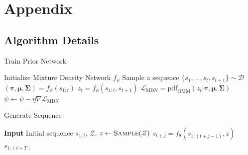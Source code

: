 \documentclass{article}
\begin{document}
%

\newpage




\newpage

\section{Appendix}


\subsection{Algorithm Details}

\begin{minipage}[t]{7cm}
  \vspace{0pt}

  \begin{algorithm}[H]
    \caption{Train Prior Network}
    \begin{algorithmic}[1]
    \State Initialize Mixture Density Network $f_\psi$
    \State Sample a sequence $\{s_1, ..., s_t, s_{t+1}\} \sim \mathcal{D}$
    \State $(\bm{\tau}, \bm{\mu}, \bm{\Sigma}) = f_{\psi}(s_{1:t})$
    \State $z_t = f_{\phi}(s_{1:t}, s_{t+1})$
      \State $\mathcal{L}_\text{MDN} = \text{pdf}_\text{GMM}(z_t | \bm{\tau}, \bm{\mu}, \bm{\Sigma})$\footnotemark
    \State $\psi \gets \psi - \eta \nabla \mathcal{L}_\text{MDN}$
    \EndWhile
  \end{algorithmic}
  \end{algorithm}
\end{minipage}%
\begin{minipage}[t]{7cm}
  \vspace{0pt}

\begin{algorithm}[H]
  \caption{Generate Sequence}\label{algo-sample}
  \begin{algorithmic}[1]
    \State \textbf{Input} Initial sequence $s_{1:t}$, $\mathcal{Z}$.
    \State $z \gets \textsc{Sample}(\mathcal{Z})$
    \State $s_{t+j} = f_\theta(s_{1:(t+j-1)}, z)$
    \EndFor
    \Return $s_{1:(t+T)}$
    \State
    \State
    \State
    \State
  \end{algorithmic}
\end{algorithm}
\end{minipage}
\end{document}
